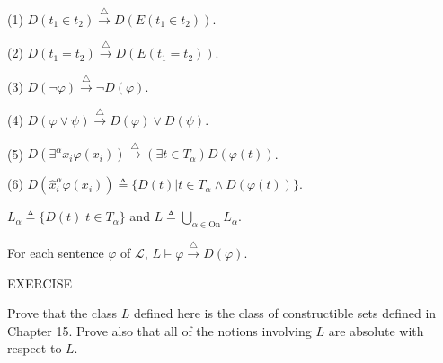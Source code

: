 (1) $D(t_1 \in t_2) \xrightarrow{\triangle} D(E(t_1 \in t_2))$.

(2) $D(t_1 = t_2) \xrightarrow{\triangle} D(E(t_1 = t_2))$.

(3) $D(\neg \varphi) \xrightarrow{\triangle} \neg D(\varphi)$.

(4) $D(\varphi \vee \psi) \xrightarrow{\triangle} D(\varphi) \vee D(\psi)$.

(5) $D(\exists^\alpha x_i \varphi(x_i)) \xrightarrow{\triangle} (\exists t \in T_\alpha) D(\varphi(t))$.

(6) $D(\hat{x}_i^\alpha \varphi(x_i)) \triangleq \{D(t) | t \in T_\alpha \wedge D(\varphi(t))\}$.

$L_\alpha \triangleq \{D(t) | t \in T_\alpha\}$ and $L \triangleq \bigcup_{\alpha \in \text{On}} L_\alpha$.

For each sentence $\varphi$ of $\mathcal{L}$, $L \models \varphi \xrightarrow{\triangle} D(\varphi)$.

EXERCISE

Prove that the class $L$ defined here is the class of constructible sets defined in Chapter 15. Prove also that all of the notions involving $L$ are absolute with respect to $L$.
